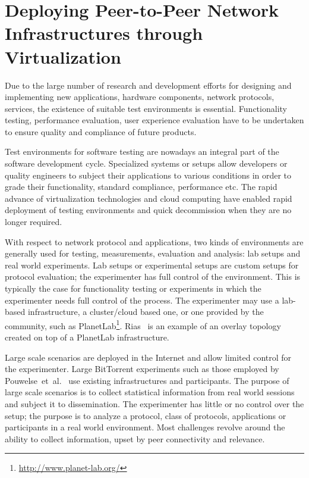
\chapter{Deploying Peer-to-Peer Network Infrastructures through
Virtualization}
\label{chapter:virt-infra}

Due to the large number of research and development efforts for designing and
implementing new applications, hardware components, network protocols,
services, the existence of suitable test environments is essential.
Functionality testing, performance evaluation, user experience evaluation have
to be undertaken to ensure quality and compliance of future products.

Test environments for software testing are nowadays an integral part of the
software development cycle. Specialized systems or setups allow developers or
quality engineers to subject their applications to various conditions in order
to grade their functionality, standard compliance, performance etc. The rapid
advance of virtualization technologies and cloud computing have enabled rapid
deployment of testing environments and quick decommission when they are no
longer required.

With respect to network protocol and applications, two kinds of environments
are generally used for testing, measurements, evaluation and analysis: lab
setups and real world experiments. Lab setups or experimental setups are
custom setups for protocol evaluation; the experimenter has full control of
the environment. This is typically the case for functionality testing or
experiments in which the experimenter needs full control of the process. The
experimenter may use a lab-based infrastructure, a cluster/cloud based one, or
one provided by the community, such as
PlanetLab\footnote{\url{http://www.planet-lab.org/}}. Rias~\cite{rias} is an
example of an overlay topology created on top of a PlanetLab infrastructure.

Large scale scenarios are deployed in the Internet and allow limited control
for the experimenter. Large BitTorrent experiments such as those employed by
Pouwelse~et~al.~\cite{measurement-study} use existing infrastructures and
participants. The purpose of large scale scenarios is to collect statistical
information from real world sessions and subject it to dissemination. The
experimenter has little or no control over the setup; the purpose is to
analyze a protocol, class of protocols, applications or participants in a real
world environment. Most challenges revolve around the ability to collect
information, upset by peer connectivity and relevance.

